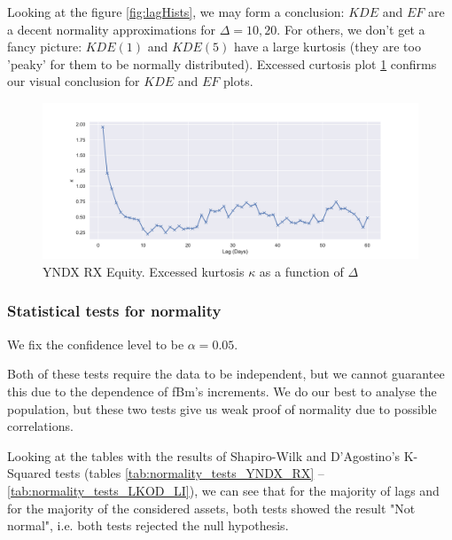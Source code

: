             Looking at the figure \ref{fig:lagHists}, we may form a conclusion: $KDE$ and $EF$ are a decent normality approximations 
            for $\Delta = 10, 20$. For others, we don't get a fancy picture: $KDE(1)$ and $KDE(5)$ have a large kurtosis 
            (they are too 'peaky' for them to be normally distributed). 
            Excessed curtosis plot \ref{fig:exkurt} confirms our visual conclusion for $KDE$ and $EF$ plots.

            \begin{figure}[htbp]
                \includegraphics[width=\textwidth]{fig/YNDX RX Equity Excessed Curtosis.pdf}
                \caption{YNDX RX Equity. Excessed kurtosis $\kappa$ as a function of $\Delta$}
                \label{fig:exkurt}
            \end{figure}


        \subsubsection{Statistical tests for normality}
            We fix the confidence level to be $\alpha = 0.05$.
            \begin{nb}
                Both of these tests require the data to be independent, but we cannot guarantee this 
                due to the dependence of fBm's increments. We do our best to analyse the population,
                but these two tests give us weak proof of normality due to possible correlations.
            \end{nb}

            Looking at the tables with the results of Shapiro-Wilk and D'Agostino's K-Squared tests 
            (tables \ref{tab:normality_tests_YNDX_RX} -- \ref{tab:normality_tests_LKOD_LI}), we can see that for the majority of lags and for the 
            majority of the considered assets, both tests showed the result "Not normal", i.e. both tests
            rejected the null hypothesis. 


